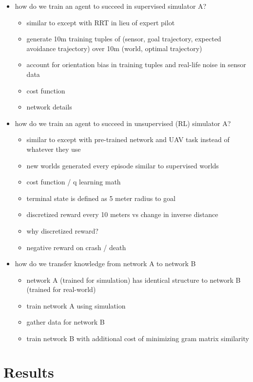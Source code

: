 \documentclass[paper=a4, fontsize=11pt]{scrartcl} %
\begin{document}
\begin{itemize}
	\item how do we train an agent to succeed in supervised simulator A?
	\begin{itemize}
		\item similar to \cite{Kim2015} except with RRT in lieu of expert pilot 
		\item generate 10m training tuples of (sensor, goal trajectory, expected avoidance trajectory) over 10m (world, optimal trajectory)
		\item account for orientation bias in training tuples and real-life noise in sensor data
		\item cost function
		\item network details
	\end{itemize}

	\item how do we train an agent to succeed in unsupervised (RL) simulator A?
	\begin{itemize}
		\item similar to \cite{Lillicrap2015} except with pre-trained network and UAV task instead of whatever they use
		\item new worlds generated every episode similar to supervised worlds
		\item cost function / q learning math
		\item terminal state is defined as 5 meter radius to goal
		\item discretized reward every 10 meters vs change in inverse distance
		\item why discretized reward?
		\item negative reward on crash / death
	\end{itemize}

	\item how do we transfer knowledge from network A to network B
	\begin{itemize}
		\item network A (trained for simulation) has identical structure to network B (trained for real-world)
		\item train network A using simulation
		\item gather data for network B
		\item train network B with additional cost of minimizing gram matrix similarity
	\end{itemize}

\end{itemize}


\section{Results}
\end{document}
